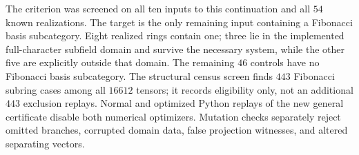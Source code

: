 The criterion was screened on all ten inputs to this continuation and
all $54$ known realizations.  The target is the only remaining input
containing a Fibonacci basis subcategory.  Eight realized rings contain
one; three lie in the implemented full-character subfield domain and
survive the necessary system, while the other five are explicitly
outside that domain.  The remaining $46$ controls have no Fibonacci
basis subcategory.  The structural census screen finds $443$ Fibonacci
subring cases among all $16612$ tensors; it records eligibility only,
not an additional $443$ exclusion replays.  Normal and optimized Python
replays of the new general certificate disable both numerical
optimizers.  Mutation checks separately reject omitted branches,
corrupted domain data, false projection witnesses, and altered
separating vectors.
